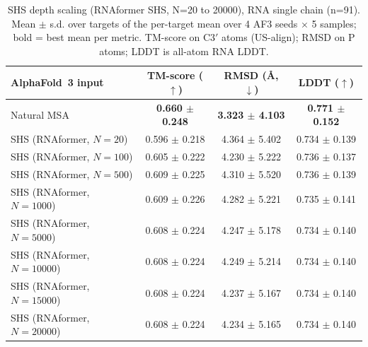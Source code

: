 \begin{table}[htbp]
\centering
\caption{SHS depth scaling (RNAformer SHS, N=20 to 20000), RNA single chain (n=91). Mean $\pm$ s.d. over targets of the per-target mean over 4 AF3 seeds $\times$ 5 samples; bold = best mean per metric. TM-score on C3$'$ atoms (US-align); RMSD on P atoms; LDDT is all-atom RNA LDDT.}
\label{tab:rna_single_chain_scaling}
\begin{tabular}{lccc}
\toprule
AlphaFold~3 input & TM-score ($\uparrow$) & RMSD (\AA, $\downarrow$) & LDDT ($\uparrow$) \\
\midrule
Natural MSA & \textbf{0.660 $\pm$ 0.248} & \textbf{3.323 $\pm$ 4.103} & \textbf{0.771 $\pm$ 0.152} \\
SHS (RNAformer, $N{=}20$) & 0.596 $\pm$ 0.218 & 4.364 $\pm$ 5.402 & 0.734 $\pm$ 0.139 \\
SHS (RNAformer, $N{=}100$) & 0.605 $\pm$ 0.222 & 4.230 $\pm$ 5.222 & 0.736 $\pm$ 0.137 \\
SHS (RNAformer, $N{=}500$) & 0.609 $\pm$ 0.225 & 4.310 $\pm$ 5.520 & 0.736 $\pm$ 0.139 \\
SHS (RNAformer, $N{=}1000$) & 0.609 $\pm$ 0.226 & 4.282 $\pm$ 5.221 & 0.735 $\pm$ 0.141 \\
SHS (RNAformer, $N{=}5000$) & 0.608 $\pm$ 0.224 & 4.247 $\pm$ 5.178 & 0.734 $\pm$ 0.140 \\
SHS (RNAformer, $N{=}10000$) & 0.608 $\pm$ 0.224 & 4.249 $\pm$ 5.214 & 0.734 $\pm$ 0.140 \\
SHS (RNAformer, $N{=}15000$) & 0.608 $\pm$ 0.224 & 4.237 $\pm$ 5.167 & 0.734 $\pm$ 0.140 \\
SHS (RNAformer, $N{=}20000$) & 0.608 $\pm$ 0.224 & 4.234 $\pm$ 5.165 & 0.734 $\pm$ 0.140 \\
\bottomrule
\end{tabular}
\end{table}

